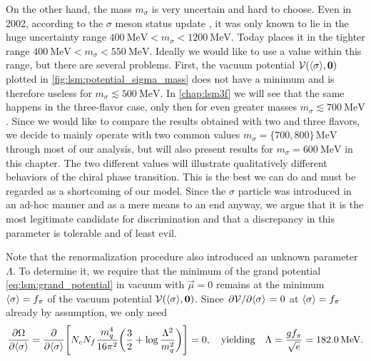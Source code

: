On the other hand, the mass $m_\sigma$ is very uncertain and hard to choose.
Even in 2002, according to the $\sigma$ meson status update \cite{ref:sigma_meson_status},
it was only known to lie in the huge uncertainty range $\SI{400}{\mega\electronvolt} < m_\sigma < \SI{1200}{\mega\electronvolt}$.
Today \cite{ref:pdg_review_2021} places it in the tighter range $\SI{400}{\mega\electronvolt} < m_\sigma < \SI{550}{\mega\electronvolt}$.
Ideally we would like to use a value within this range, but there are several problems.
First, the vacuum potential $\mathcal{V}(\langle \sigma \rangle,{\bm{0}})$ plotted in \cref{fig:lsm:potential_sigma_mass} does not have a minimum and is therefore useless for $m_\sigma \lesssim \SI{500}{\mega\electronvolt}$.
In \cref{chap:lsm3f} we will see that the same happens in the three-flavor case, only then for even greater masses $m_\sigma \lesssim \SI{700}{\mega\electronvolt}$.
Since we would like to compare the results obtained with two and three flavors,
we decide to mainly operate with two common values $m_\sigma = \{700,800\} \, \si{\mega\electronvolt}$ through most of our analysis,
but will also present results for $m_\sigma = \SI{600}{\mega\electronvolt}$ in this chapter.
The two different values will illustrate qualitatively different behaviors of the chiral phase transition.
This is the best we can do and must be regarded as a shortcoming of our model.
Since the $\sigma$ particle was introduced in an ad-hoc manner and as a mere means to an end anyway,
we argue that it is the most legitimate candidate for discrimination
and that a discrepancy in this parameter is tolerable and of least evil.

Note that the renormalization procedure also introduced an unknown parameter $\Lambda$.
To determine it, we require that the minimum of the grand potential \eqref{eq:lsm:grand_potential} in vacuum with $\vec{\mu}=0$
remains at the minimum $\langle \sigma \rangle = f_\pi$ of the vacuum potential $\mathcal{V}(\langle \sigma \rangle,{\bm{0}})$.
Since $\pdv{\mathcal{V}}/{\langle \sigma \rangle} = 0$ at $\langle \sigma \rangle=f_\pi$ already by assumption, we only need
\begin{equation}
	\pdv{\Omega}{ \langle \sigma \rangle} =
	\pdv*{\Bigg[ N_c N_f \frac{m_q^4}{16 \pi^2} \bigg( \frac32 + \log \frac{\Lambda^2}{m_q^2} \bigg) \Bigg] }{\langle \sigma \rangle} = 0,
	\quad \text{yielding} \quad
	\Lambda = \frac{g f_\pi}{\sqrt{e}} = \SI{182.0}{\mega\electronvolt}.
\label{eq:lsm:potential_vacuum_minimum}
\end{equation}

